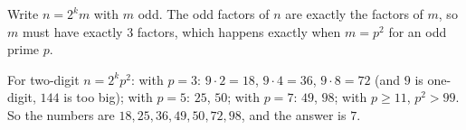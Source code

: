 Write $n=2^km$ with $m$ odd. The odd factors of $n$ are exactly the factors of $m$, so $m$ must have exactly $3$ factors, which happens exactly when $m=p^2$ for an odd prime $p$.

For two-digit $n=2^kp^2$: with $p=3$: $9\cdot2=18$, $9\cdot4=36$, $9\cdot8=72$ (and $9$ is one-digit, $144$ is too big); with $p=5$: $25$, $50$; with $p=7$: $49$, $98$; with $p\ge11$, $p^2>99$. So the numbers are $18,25,36,49,50,72,98$, and the answer is $\boxed{7}$.
